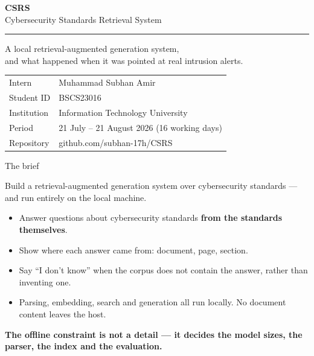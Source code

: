\documentclass[aspectratio=169,11pt]{beamer}
\newcommand{\lede}[1]{{\color{soft}\small #1\par\medskip}}
\newcommand{\keytake}[1]{%
  \vfill
  \noindent\colorbox{accenttint}{%
    \begin{minipage}{\dimexpr\textwidth-2\fboxsep-2\fboxrule\relax}
      \vspace{2pt}
      \small\color{accent}\textbf{#1}
      \vspace{2pt}
    \end{minipage}}\par}
\begin{document}
\begin{frame}[plain]
  \vspace{1.2em}
  {\color{accent}\Large\bfseries CSRS}\\[0.15em]
  {\color{soft}\large Cybersecurity Standards Retrieval System}

  \vspace{1.1em}
  {\color{rulegrey}\rule{\textwidth}{0.8pt}}
  \vspace{1.1em}

  {\large A local retrieval-augmented generation system,\\
   and what happened when it was pointed at real intrusion alerts.}

  \vspace{1.6em}
  \begin{tabular}{@{}ll@{}}
    {\color{soft}\small Intern} & \small Muhammad Subhan Amir \\
    {\color{soft}\small Student ID} & \small BSCS23016 \\
    {\color{soft}\small Institution} & \small Information Technology University \\
    {\color{soft}\small Period} & \small 21 July -- 21 August 2026 \quad (16 working days) \\
    {\color{soft}\small Repository} & \small\ttfamily github.com/subhan-17h/CSRS \\
  \end{tabular}
\end{frame}

\begin{frame}{The brief}
  \lede{Build a retrieval-augmented generation system over cybersecurity standards --- and run entirely on the local machine.}
  \begin{itemize}
    \item Answer questions about cybersecurity standards \textbf{from the standards themselves}.
    \item Show where each answer came from: document, page, section.
    \item Say ``I don't know'' when the corpus does not contain the answer, rather than inventing one.
    \item Parsing, embedding, search and generation all run locally. No document content leaves the host.
  \end{itemize}
  \keytake{The offline constraint is not a detail --- it decides the model sizes, the parser, the index and the evaluation.}
\end{frame}
\end{document}
